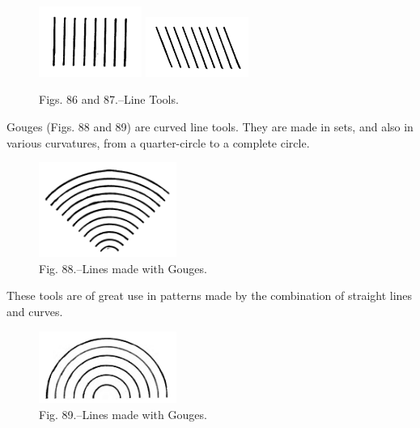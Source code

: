 \documentclass[twoside]{book}
\begin{document}
	\begin{figure}[h]
		\centering
		\includegraphics[width=0.3\textwidth]{Figures/_086.png}
		\includegraphics[width=0.3\textwidth]{Figures/_087.png}
		\caption*{
			Figs. 86 and 87.--Line Tools.
		}
	\end{figure}
	
Gouges (Figs. 88 and 89) are curved line tools.
They are made in sets, and also in various curvatures,
from a quarter-circle to a complete circle.
	\begin{figure}[h]
		\centering
		\includegraphics[width=0.4\textwidth]{Figures/_088.png}
		\caption*{Fig. 88.--Lines made with Gouges.}
	\end{figure}
These tools are of great use in patterns made by the
combination of straight lines and curves.

	\begin{figure}[h]
		\centering
		\includegraphics[width=0.4\textwidth]{Figures/_089.png}
		\caption*{Fig. 89.--Lines made with Gouges.}
	\end{figure}
\end{document}
